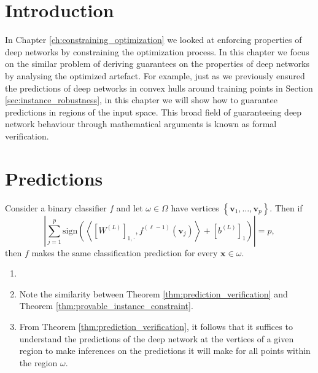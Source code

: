 \section{Introduction}

In Chapter \ref{ch:constraining_optimization} we looked at enforcing properties of deep networks by constraining the optimization process. In this chapter we focus on the similar problem of deriving guarantees on the properties of deep networks by analysing the optimized artefact. For example, just as we previously ensured the predictions of deep networks in convex hulls around training points in Section \ref{sec:instance_robustness}, in this chapter we will show how to guarantee predictions in regions of the input space. This broad field of guaranteeing deep network behaviour through mathematical arguments is known as formal verification.

\section{Predictions}

\begin{theorem}\label{thm:prediction_verification}
    Consider a binary classifier $f$ and let $\omega\in\Omega$ have vertices $\left\{\mathbf{v}_1,\dots,\mathbf{v}_p\right\}$. Then if $$\left\vert\sum_{j=1}^p\mathrm{sign}\left(\left\langle\left[W^{(L)}\right]_{1,\cdot},f^{(\ell-1)}\left(\mathbf{v}_j\right)\right\rangle+\left[b^{(L)}\right]_1\right)\right\vert=p,$$then $f$ makes the same classification prediction for every $\mathbf{x}\in\omega$. 
\end{theorem}

\begin{tproof}
    \TODO
\end{tproof}

\begin{remark}
    \begin{enumerate}
        \item[]
        \item Note the similarity between Theorem \ref{thm:prediction_verification} and Theorem \ref{thm:provable_instance_constraint}.
        \item From Theorem \ref{thm:prediction_verification}, it follows that it suffices to understand the predictions of the deep network at the vertices of a given region to make inferences on the predictions it will make for all points within the region $\omega$.
    \end{enumerate}
\end{remark}

